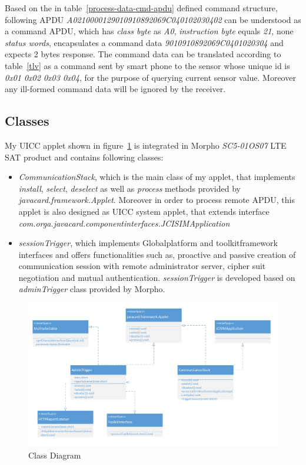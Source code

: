 Based on the in table~\ref{process-data-cmd-apdu} defined command structure, following APDU \emph{A0210000129010910892069C040102030402}\label{remote-apdu-example} can be understood as a command APDU,  which has \emph{class byte} as \emph{A0}, \emph{instruction byte} equals \emph{21}, none \emph{status words}, encapsulates a command data \emph{9010910892069C0401020304} and expects 2 bytes response. The command data can be translated according to table~\ref{tlv} as a command sent by smart phone to the sensor whose unique id is \emph{0x01 0x02 0x03  0x04}, for the purpose of querying current sensor value. Moreover any ill-formed command data will be ignored by the receiver.

\subsection{Classes}\sloppy
My UICC applet shown in figure~\ref{fig:class} is integrated in Morpho \emph{SC5-01OS07} LTE SAT product and contains following classes:
 \begin{itemize}
  \item  \emph{CommunicationStack}, which is the main class of my applet, that implements \emph{install}, \emph{select}, \emph{deselect} as well as \emph{process} methods provided by \emph{javacard.framework.Applet}. Moreover in order to process remote APDU, this applet is also designed as UICC system applet, that extends interface \emph{com.orga.javacard.componentinterfaces.JCISIMApplication}
  \item  \emph{sessionTrigger}, which implements Globalplatform  and toolkitframework interfaces and offers functionalities such as, proactive and passive creation of communication session with remote administrator server, cipher suit negotiation and mutual authentication. \emph{sessionTrigger} is developed based on \emph{adminTrigger} class provided by Morpho.
\end{itemize}

\begin{figure}[!htbp]
	\centering
	\includegraphics[width=1.0\textwidth]{class}
		\caption{Class Diagram}
	\label{fig:class}
\end{figure}

